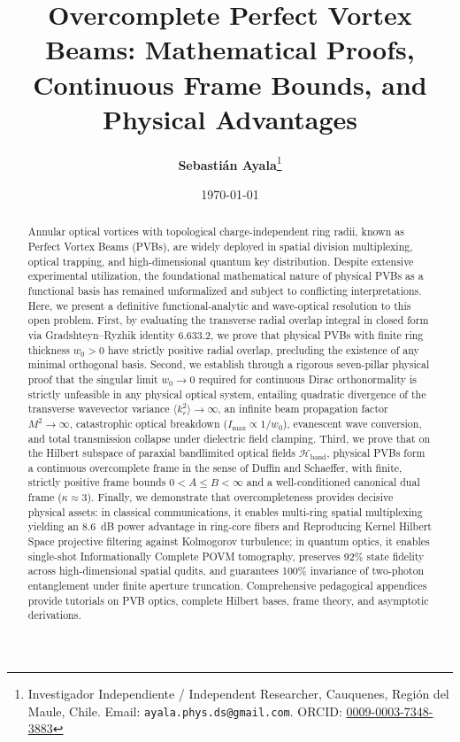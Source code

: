 \documentclass[11pt,a4paper]{article}
\title{\textbf{\LARGE Overcomplete Perfect Vortex Beams: Mathematical Proofs, Continuous Frame Bounds, and Physical Advantages}}
\author{\textbf{Sebastián Ayala}\thanks{Investigador Independiente / Independent Researcher, Cauquenes, Regi{\'o}n del Maule, Chile. Email: \texttt{ayala.phys.ds@gmail.com}. ORCID: \href{https://orcid.org/0009-0003-7348-3883}{0009-0003-7348-3883}}}
\date{\today}
\begin{document}
\maketitle

\begin{abstract}
Annular optical vortices with topological charge-independent ring radii, known as Perfect Vortex Beams (PVBs), are widely deployed in spatial division multiplexing, optical trapping, and high-dimensional quantum key distribution. Despite extensive experimental utilization, the foundational mathematical nature of physical PVBs as a functional basis has remained unformalized and subject to conflicting interpretations. Here, we present a definitive functional-analytic and wave-optical resolution to this open problem. First, by evaluating the transverse radial overlap integral in closed form via Gradshteyn--Ryzhik identity 6.633.2, we prove that physical PVBs with finite ring thickness $w_0 > 0$ have strictly positive radial overlap, precluding the existence of any minimal orthogonal basis. Second, we establish through a rigorous seven-pillar physical proof that the singular limit $w_0 \to 0$ required for continuous Dirac orthonormality is strictly unfeasible in any physical optical system, entailing quadratic divergence of the transverse wavevector variance $\langle k_r^2 \rangle \to \infty$, an infinite beam propagation factor $M^2 \to \infty$, catastrophic optical breakdown ($I_{\max} \propto 1/w_0$), evanescent wave conversion, and total transmission collapse under dielectric field clamping. Third, we prove that on the Hilbert subspace of paraxial bandlimited optical fields $\mathcal{H}_{\text{band}}$, physical PVBs form a continuous overcomplete frame in the sense of Duffin and Schaeffer, with finite, strictly positive frame bounds $0 < A \le B < \infty$ and a well-conditioned canonical dual frame ($\kappa \approx 3$). Finally, we demonstrate that overcompleteness provides decisive physical assets: in classical communications, it enables multi-ring spatial multiplexing yielding an 8.6~dB power advantage in ring-core fibers and Reproducing Kernel Hilbert Space projective filtering against Kolmogorov turbulence; in quantum optics, it enables single-shot Informationally Complete POVM tomography, preserves 92\% state fidelity across high-dimensional spatial qudits, and guarantees 100\% invariance of two-photon entanglement under finite aperture truncation. Comprehensive pedagogical appendices provide tutorials on PVB optics, complete Hilbert bases, frame theory, and asymptotic derivations.
\end{abstract}
\end{document}
